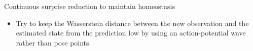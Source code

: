 \begin{frame}[allowframebreaks]{Continuous surprise reduction to maintain homeostasis}
    \begin{itemize}
        \item Try to keep the Wasserstein distance between the new observation and the estimated state from the prediction low by using an action-potential wave rather than pose points.
    \end{itemize}
\end{frame}